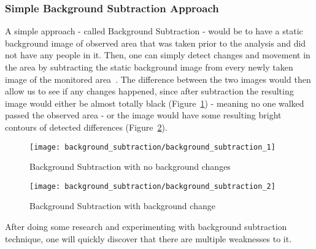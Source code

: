 	\subsubsection{Simple Background Subtraction Approach}
	A simple approach - called Background Subtraction - would be to have a static background image of observed area that was taken prior to the analysis and did not have any people in it. Then, one can simply detect changes and movement in the area by subtracting the static background image from every newly taken image of the monitored area~\cite{background_subtraction_1}. The difference between the two images would then allow us to see if any changes happened, since after subtraction the resulting image would either be almost totally black (Figure~\ref{fig:background_subtraction_1}) - meaning no one walked passed the observed area - or the image would have some resulting bright contours of detected differences (Figure~\ref{fig:background_subtraction_2}).
	\begin{figure}[ht]
		\centering
		\texttt{[image: background\_subtraction/background\_subtraction\_1]}
		\caption{Background Subtraction with no background changes}
		\label{fig:background_subtraction_1}
	\end{figure}
	\begin{figure}[ht]
		\centering
		\texttt{[image: background\_subtraction/background\_subtraction\_2]}
		\caption{Background Subtraction with background change}
		\label{fig:background_subtraction_2}
	\end{figure}
	
	After doing some research and experimenting with background subtraction technique, one will quickly discover that there are multiple weaknesses to it. 
	
